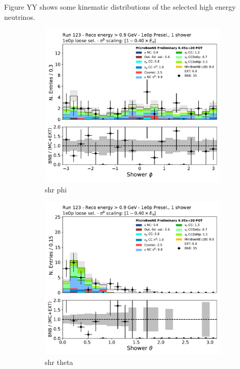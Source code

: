 Figure YY shows some kinematic distributions of the selected high energy neutrinos. 
\begin{figure}[H]
    \centering
    \begin{subfigure}{0.3\textwidth}
    \includegraphics[width=1.0\textwidth]{1e0p/High_E_Sideband/BDT_selection/shr_phi.pdf}
    \caption{shr phi}
    \end{subfigure}
    \begin{subfigure}{0.3\textwidth}
    \includegraphics[width=1.0\textwidth]{1e0p/High_E_Sideband/BDT_selection/shr_theta.pdf}
    \caption{shr theta}
    \end{subfigure}
    \caption{} 
    \label{fig:HE_1eNp_1}
\end{figure}
